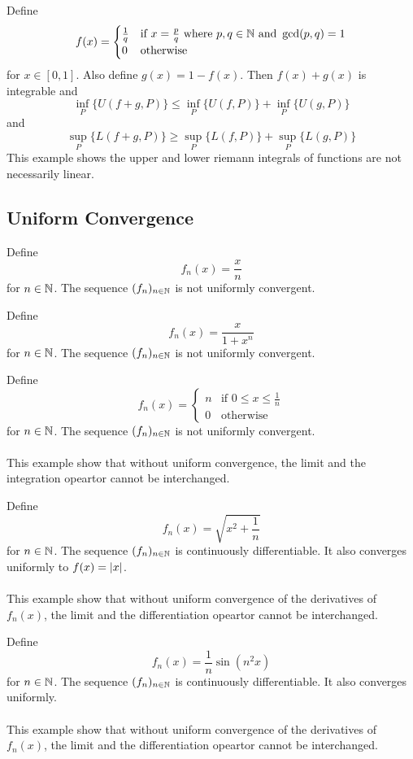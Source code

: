 \documentclass[a4paper]{article}
\begin{document}
\begin{eg}{}{} Define $$f(x)=\begin{cases}
\frac{1}{q} & \text{if } x=\frac{p}{q} \text{ where } p,q\in\mathbb{N} \text{ and } \gcd(p,q)=1\\
0 & \text{otherwise }
\end{cases}$$ for $x\in[0,1]$. Also define $g(x)=1-f(x)$.  Then $f(x)+g(x)$ is integrable and $$\inf_{P}\{U(f+g,P)\}\leq\inf_{P}\{U(f,P)\}+\inf_{P}\{U(g,P)\}$$ and $$\sup_{P}\{L(f+g,P)\}\geq\sup_{P}\{L(f,P)\}+\sup_{P}\{L(g,P)\}$$ This example shows the upper and lower riemann integrals of functions are not necessarily linear. 
\end{eg}

\subsection{Uniform Convergence}
\begin{eg}{}{} Define $$f_n(x)=\frac{x}{n}$$ for $n\in\mathbb{N}$. The sequence $(f_n)_{n\in\mathbb{N}}$ is not uniformly convergent. 
\end{eg}

\begin{eg}{}{} Define $$f_n(x)=\frac{x}{1+x^n}$$ for $n\in\mathbb{N}$. The sequence $(f_n)_{n\in\mathbb{N}}$ is not uniformly convergent. 
\end{eg}

\begin{eg}{}{} Define $$f_n(x)=\begin{cases}
n & \text{if }0\leq x\leq\frac{1}{n}\\
0 & \text{otherwise }
\end{cases}$$ for $n\in\mathbb{N}$. The sequence $(f_n)_{n\in\mathbb{N}}$ is not uniformly convergent. \\~\\
This example show that without uniform convergence, the limit and the integration opeartor cannot be interchanged. 
\end{eg}

\begin{eg}{}{} Define $$f_n(x)=\sqrt{x^2+\frac{1}{n}}$$ for $n\in\mathbb{N}$. The sequence $(f_n)_{n\in\mathbb{N}}$ is continuously differentiable. It also converges uniformly to $f(x)=\abs{x}$. \\~\\
This example show that without uniform convergence of the derivatives of $f_n(x)$, the limit and the differentiation opeartor cannot be interchanged. 
\end{eg}

\begin{eg}{}{} Define $$f_n(x)=\frac{1}{n}\sin(n^2x)$$ for $n\in\mathbb{N}$. The sequence $(f_n)_{n\in\mathbb{N}}$ is continuously differentiable. It also converges uniformly. \\~\\
This example show that without uniform convergence of the derivatives of $f_n(x)$, the limit and the differentiation opeartor cannot be interchanged. 
\end{eg}
\end{document}
